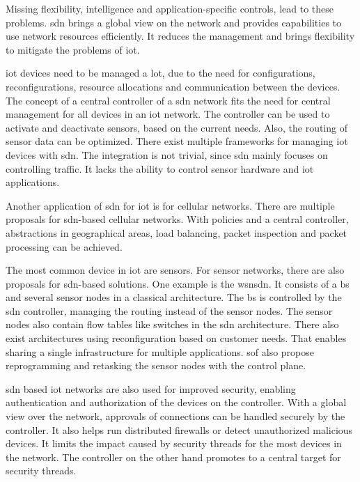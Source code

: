 \documentclass[conference]{IEEEtran}
\begin{document}
	Missing flexibility, intelligence and application-specific controls, lead to these problems. \ac{sdn} brings a global view on the network and provides capabilities to use network resources efficiently. It reduces the management and brings flexibility to mitigate the problems of \ac{iot}.

	\ac{iot} devices need to be managed a lot, due to the need for configurations, reconfigurations, resource allocations and communication between the devices. \cite{10.1145/3102304.3102319} The concept of a central controller of a \ac{sdn} network fits the need for central management for all devices in an \ac{iot} network. The controller can be used to activate and deactivate sensors, based on the current needs. Also, the routing of sensor data can be optimized. \cite{Li2020-lx} There exist multiple frameworks for managing \ac{iot} devices with \ac{sdn}. \cite{10.1145/3102304.3102319} The integration is not trivial, since \ac{sdn} mainly focuses on controlling traffic. It lacks the ability to control sensor hardware and \ac{iot} applications. \cite{Li2020-lx}

	Another application of \ac{sdn} for \ac{iot} is for cellular networks. There are multiple proposals for \ac{sdn}-based cellular networks. With policies and a central controller, abstractions in geographical areas, load balancing, packet inspection and packet processing can be achieved. \cite{10.1145/3102304.3102319}

	The most common device in \ac{iot} are sensors. For sensor networks, there are also proposals for \ac{sdn}-based solutions. One example is the \ac{wsnsdn}. It consists of a \ac{bs} and several sensor nodes in a classical architecture. The \ac{bs} is controlled by the \ac{sdn} controller, managing the routing instead of the sensor nodes. The sensor nodes also contain flow tables like switches in the \ac{sdn} architecture. \cite{10.1145/3102304.3102319} There also exist architectures using reconfiguration based on customer needs. That enables sharing a single infrastructure for multiple applications. \ac{sof} also propose reprogramming and retasking the sensor nodes with the control plane. \cite{Li2020-lx} 

	\ac{sdn} based \ac{iot} networks are also used for improved security, enabling authentication and authorization of the devices on the controller. With a global view over the network, approvals of connections can be handled securely by the controller. It also helps run distributed firewalls or detect unauthorized malicious devices. \cite{10.1145/3102304.3102319} It limits the impact caused by security threads for the most devices in the network. The controller on the other hand promotes to a central target for security threads. \cite{Li2020-lx}
\end{document}
